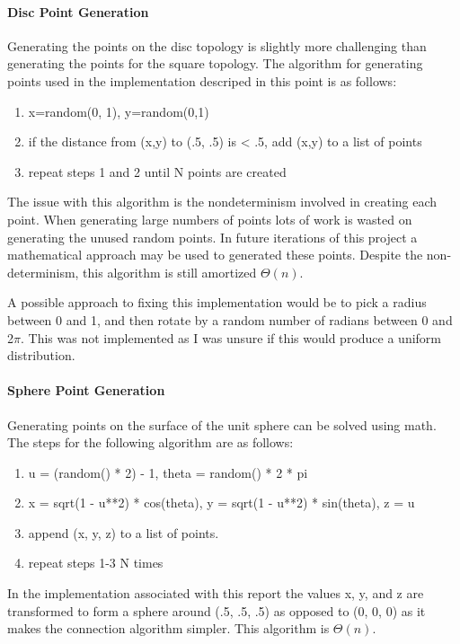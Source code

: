 \documentclass{article}
\begin{document}
  \paragraph{Disc Point Generation}
		Generating the points on the disc topology is slightly more challenging than generating the points for the square topology.
    The algorithm for generating points used in the implementation descriped in this point is as follows:
    \begin{enumerate}
      \item x=random(0, 1), y=random(0,1)
      \item if the distance from (x,y) to (.5, .5) is < .5, add (x,y) to a list of points
      \item repeat steps 1 and 2 until N points are created
    \end{enumerate}
    The issue with this algorithm is the nondeterminism involved in creating each point.
    When generating large numbers of points lots of work is wasted on generating the unused random points.
    In future iterations of this project a mathematical approach may be used to generated these points.
    Despite the non-determinism, this algorithm is still amortized $\Theta(n)$.

    A possible approach to fixing this implementation would be to pick a radius between 0 and 1, and then rotate by a random number of radians between 0 and 2$\pi$.
    This was not implemented as I was unsure if this would produce a uniform distribution.

  \paragraph{Sphere Point Generation}
    Generating points on the surface of the unit sphere can be solved using math.
    The steps for the following algorithm are as follows:

    \begin{enumerate}
      \item u = (random() * 2) - 1, theta = random() * 2 * pi
      \item x = sqrt(1 - u**2) * cos(theta), y = sqrt(1 - u**2) * sin(theta), z = u
      \item append (x, y, z) to a list of points.
      \item repeat steps 1-3 N times
    \end{enumerate}

    In the implementation associated with this report the values x, y, and z are transformed to form a sphere around (.5, .5, .5) as opposed to (0, 0, 0) as it makes the connection algorithm simpler.
    This algorithm is $\Theta(n)$.
\end{document}
